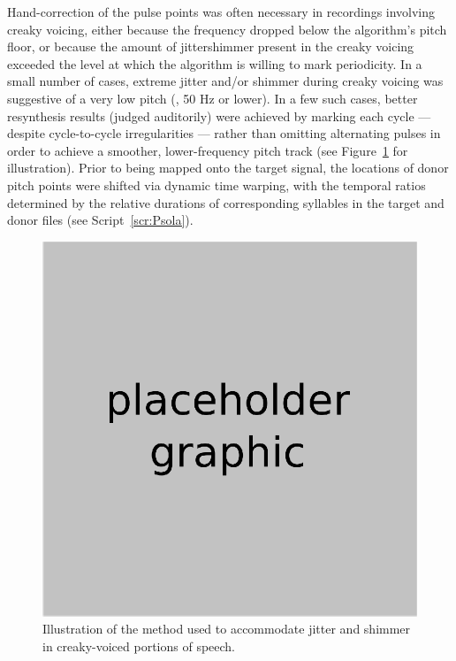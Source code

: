 Hand-correction of the pulse points was often necessary in recordings involving creaky voicing, either because the frequency dropped below the algorithm’s pitch floor, or because the amount of jitter\slsh{}shimmer present in the creaky voicing exceeded the level at which the algorithm is willing to mark periodicity.  In a small number of cases, extreme jitter and/or shimmer during creaky voicing was suggestive of a very low pitch (\ie, 50 Hz or lower).  In a few such cases, better resynthesis results (judged auditorily) were achieved by marking each cycle — despite cycle-to-cycle irregularities — rather than omitting alternating pulses in order to achieve a smoother, lower-frequency pitch track (see Figure~\ref{fig:JitShim} for illustration).  %
Prior to being mapped onto the target signal, the locations of donor pitch points were shifted via dynamic time warping, with the temporal ratios determined by the relative durations of corresponding syllables in the target and donor files (see Script~\ref{scr:Psola}).

\begin{figure}
	\begin{centering}
	\includegraphics{figures/xxx.eps}
	\caption[Handling of jitter and shimmer in resynthesis]{Illustration of the method used to accommodate jitter and shimmer in creaky-voiced portions of speech.\label{fig:JitShim}}
	\end{centering}
\end{figure}

